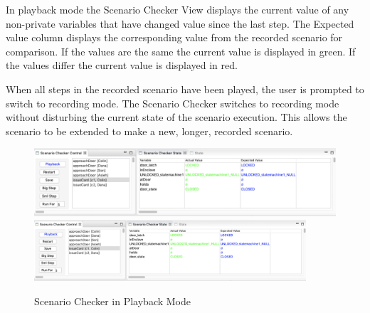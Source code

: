 In playback mode the Scenario Checker View displays the current value of any non-private variables that have changed value since the last step.
The Expected value column displays the corresponding value from the recorded scenario for comparison.
If the values are the same the current value is displayed in green. 
If the values differ the current value is displayed in red.

When all steps in the recorded scenario have been played, the user is prompted to switch to recording mode. 
The Scenario Checker switches to recording mode without disturbing the current state of the scenario execution. 
This allows the scenario to be extended to make a new, longer, recorded scenario.

\begin{figure}[!htbp]
	\centering
	\ifplastex
	\includegraphics[width=900]{figures/playback}
	\else
	\includegraphics[width=0.9\textwidth]{figures/playback}
	\fi
	\caption{Scenario Checker in Playback Mode}
	\label{fig:playback}
\end{figure}

